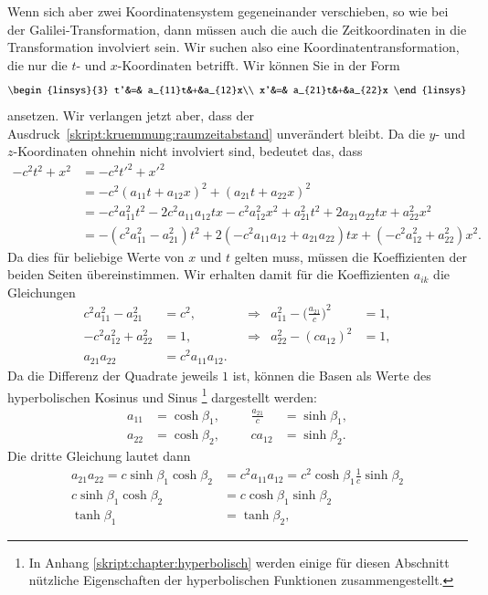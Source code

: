 Wenn sich aber zwei Koordinatensystem gegeneinander verschieben,
so wie bei der Galilei-Transformation, dann müssen auch die auch
die Zeitkoordinaten in die Transformation involviert sein.
Wir suchen also eine Koordinatentransformation, die nur die
$t$- und $x$-Koordinaten betrifft.
Wir können Sie in der Form
\begin{equation}
\begin{linsys}{3}
t'&=& a_{11}t&+&a_{12}x\\
x'&=& a_{21}t&+&a_{22}x
\end{linsys}
\end{equation}
ansetzen.
Wir verlangen jetzt aber, dass der
Ausdruck~\eqref{skript:kruemmung:raumzeitabstand}
unverändert bleibt.
Da die $y$- und $z$-Koordinaten ohnehin nicht involviert sind, bedeutet
das, dass
\begin{align*}
-c^2t^2 + x^2
&=
-c^2t'^2 + x'^2
\\
&=
-c^2(a_{11}t+a_{12}x)^2 + (a_{21}t+a_{22}x)^2
\\
&=
-c^2a_{11}^2t^2 -2c^2a_{11}a_{12}tx -c^2a_{12}^2x^2
+a_{21}^2t^2+2a_{21}a_{22}tx+a_{22}^2x^2
\\
&=
-(c^2a_{11}^2 - a_{21}^2)t^2
+2(-c^2a_{11}a_{12}+a_{21}a_{22})tx
+(-c^2a_{12}^2 + a_{22}^2)x^2.
\end{align*}
Da dies für beliebige Werte von $x$ und $t$ gelten muss, müssen die
Koeffizienten der beiden Seiten übereinstimmen. 
Wir erhalten damit für die Koeffizienten $a_{ik}$ die Gleichungen
\[
\begin{aligned}
c^2a_{11}^2-a_{21}^2&=c^2,
&&\Rightarrow&
a_{11}^2
-
\biggl(\frac{a_{21}}{c}\biggr)^2
&=1,
\\
-c^2a_{12}^2+a_{22}^2&=1,
&&\Rightarrow
&
a_{22}^2 - (ca_{12})^2&=1,
\\
a_{21}a_{22}&=c^2a_{11}a_{12}.
\end{aligned}
\]
Da die Differenz der Quadrate jeweils $1$ ist, können die Basen
als Werte des hyperbolischen Kosinus und Sinus%
\footnote{In Anhang \ref{skript:chapter:hyperbolisch} werden einige für
diesen Abschnitt nützliche Eigenschaften der hyperbolischen Funktionen
zusammengestellt.}
dargestellt werden:
\[
\begin{aligned}
a_{11}&=\cosh\beta_1, &&&\frac{a_{21}}{c}&=\sinh\beta_1,
\\
a_{22}&=\cosh\beta_2,&&&ca_{12}&=\sinh\beta_2.
\end{aligned}
\]
Die dritte Gleichung lautet dann
\begin{align*}
a_{21}a_{22}=c\sinh\beta_1\cosh\beta_2
&=
c^2a_{11}a_{12}=c^2\cosh\beta_1\frac1c\sinh\beta_2
\\
c\sinh\beta_1\cosh\beta_2
&=
c\cosh\beta_1\sinh\beta_2
\\
\tanh\beta_1&=\tanh\beta_2,
\end{align*}
